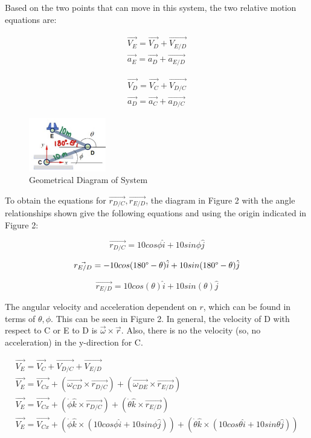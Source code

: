 \documentclass[12pt, a4paper]{article}
\begin{document}
Based on the two points that can move in this system, the two relative motion equations are:

\begin{align}
    \vec{V_E} = \vec{V_D} + \vec{V_{E/D}} \\
    \vec{a_E} = \vec{a_D} + \vec{a_{E/D}}
\end{align}

\begin{align}
    \vec{V_D} = \vec{V_C} + \vec{V_{D/C}} \\
    \vec{a_D} = \vec{a_C} + \vec{a_{D/C}}
\end{align}

\begin{figure}[htbp]
    \centering
    \includegraphics[width=0.3\textwidth]{figure2.jpg}
    \caption{Geometrical Diagram of System}
    \label{fig:label2}
\end{figure}

\FloatBarrier

To obtain the equations for $\vec{r_{D/C}}, \vec{r_{E/D}}$, the diagram in Figure 2 with the angle relationships shown give the following equations and using the origin indicated in Figure 2:

\begin{equation}
    \vec{r_{D/C}} = 10cos\phi\hat{i} + 10sin\phi\hat{j}
\end{equation}

\begin{equation}
    \vec{r_{E/D}} = -10cos(180\degree - \theta)\hat{i} + 10sin(180\degree - \theta)\hat{j}
\end{equation}

\begin{equation}
    \vec{r_{E/D}} = 10cos(\theta)\hat{i} + 10sin(\theta)\hat{j}
\end{equation}

The angular velocity and acceleration dependent on $r$, which can be found in terms of $\theta, \phi$. This can be seen in Figure 2. In general, the velocity of D with respect to C or E to D is $\vec{\omega} \times \vec{r}$. Also, there is no the velocity (so, no acceleration) in the y-direction for C.

\begin{align}
    \vec{V_E} = \vec{V_C} + \vec{V_{D/C}} + \vec{V_{E/D}} \\ 
    \vec{V_E} = \vec{V_{Cx}} + (\vec{\omega_{CD}} \times \vec{r_{D/C}}) + (\vec{\omega_{DE}} \times \vec{r_{E/D}}) \\ 
    \vec{V_E} = \vec{V_{Cx}} + (\dot\phi\hat{k} \times \vec{r_{D/C}}) + (\dot\theta\hat{k} \times \vec{r_{E/D}}) \\ 
    \vec{V_E} = \vec{V_{Cx}} + (\dot\phi\hat{k} \times (10cos\phi\hat{i} + 10sin\phi\hat{j})) + (\dot\theta\hat{k} \times (10cos\theta\hat{i} + 10sin\theta\hat{j}))
\end{align}
\end{document}
